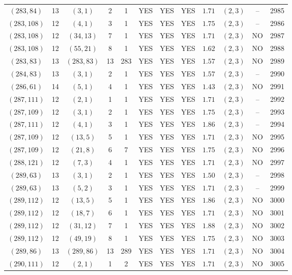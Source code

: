 \begin{longtable}{|c|c|c|c|c|c|c|c|c|c|c|c|}
$(283,84)$ & 13 & $(3,1)$ & 2 & 1 & YES & YES & YES & $1.71$ & $(2,3)$ & -- & 2985\\
$(283,108)$ & 12 & $(4,1)$ & 3 & 1 & YES & YES & YES & $1.75$ & $(2,3)$ & -- & 2986\\
$(283,108)$ & 12 & $(34,13)$ & 7 & 1 & YES & YES & YES & $1.71$ & $(2,3)$ & NO & 2987\\
$(283,108)$ & 12 & $(55,21)$ & 8 & 1 & YES & YES & YES & $1.62$ & $(2,3)$ & NO & 2988\\
$(283,83)$ & 13 & $(283,83)$ & 13 & 283 & YES & YES & YES & $1.57$ & $(2,3)$ & NO & 2989\\
$(284,83)$ & 13 & $(3,1)$ & 2 & 1 & YES & YES & YES & $1.57$ & $(2,3)$ & -- & 2990\\
$(286,61)$ & 14 & $(5,1)$ & 4 & 1 & YES & YES & YES & $1.43$ & $(2,3)$ & NO & 2991\\
$(287,111)$ & 12 & $(2,1)$ & 1 & 1 & YES & YES & YES & $1.71$ & $(2,3)$ & -- & 2992\\
$(287,109)$ & 12 & $(3,1)$ & 2 & 1 & YES & YES & YES & $1.75$ & $(2,3)$ & -- & 2993\\
$(287,111)$ & 12 & $(4,1)$ & 3 & 1 & YES & YES & YES & $1.86$ & $(2,3)$ & -- & 2994\\
$(287,109)$ & 12 & $(13,5)$ & 5 & 1 & YES & YES & YES & $1.71$ & $(2,3)$ & NO & 2995\\
$(287,109)$ & 12 & $(21,8)$ & 6 & 7 & YES & YES & YES & $1.75$ & $(2,3)$ & NO & 2996\\
$(288,121)$ & 12 & $(7,3)$ & 4 & 1 & YES & YES & YES & $1.71$ & $(2,3)$ & NO & 2997\\
$(289,63)$ & 13 & $(3,1)$ & 2 & 1 & YES & YES & YES & $1.50$ & $(2,3)$ & -- & 2998\\
$(289,63)$ & 13 & $(5,2)$ & 3 & 1 & YES & YES & YES & $1.71$ & $(2,3)$ & -- & 2999\\
$(289,112)$ & 12 & $(13,5)$ & 5 & 1 & YES & YES & YES & $1.86$ & $(2,3)$ & NO & 3000\\
$(289,112)$ & 12 & $(18,7)$ & 6 & 1 & YES & YES & YES & $1.71$ & $(2,3)$ & NO & 3001\\
$(289,112)$ & 12 & $(31,12)$ & 7 & 1 & YES & YES & YES & $1.88$ & $(2,3)$ & NO & 3002\\
$(289,112)$ & 12 & $(49,19)$ & 8 & 1 & YES & YES & YES & $1.75$ & $(2,3)$ & NO & 3003\\
$(289,86)$ & 13 & $(289,86)$ & 13 & 289 & YES & YES & YES & $1.71$ & $(2,3)$ & NO & 3004\\
$(290,111)$ & 12 & $(2,1)$ & 1 & 2 & YES & YES & YES & $1.71$ & $(2,3)$ & NO & 3005\\

\end{longtable}
